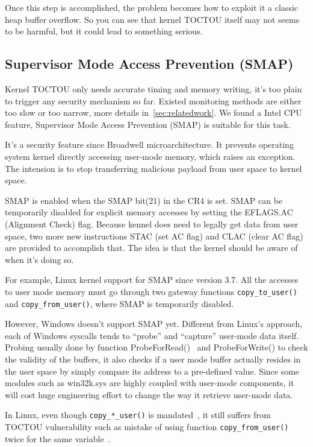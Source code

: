 Once this step is accomplished, the problem becomes how to exploit it a classic heap buffer overflow. So you can see that kernel TOCTOU itself may not seems to be harmful, but it could lead to something serious. 

\subsection{Supervisor Mode Access Prevention (SMAP)}
Kernel TOCTOU only needs accurate timing and memory writing, it's too plain to trigger any security mechanism so far. Existed monitoring methods are either too slow or too narrow, more details in~\autoref{sec:relatedwork}. We found a Intel CPU feature, Supervisor Mode Access Prevention (SMAP) is suitable for this task. 

It's a security feature since Broadwell microarchitecture. It prevents operating system kernel directly accessing user-mode memory, which raises an exception. The intension is to stop transferring malicious payload from user space to kernel space.

SMAP is enabled when the SMAP bit(21) in the CR4 is set. SMAP can be temporarily disabled for explicit memory accesses by setting the EFLAGS.AC (Alignment Check) flag. Because kennel does need to legally get data from user space, two more new instructions STAC (set AC flag) and CLAC (clear AC flag) are provided to accomplish that. The idea is that the kernel should be aware of when it's doing so. 

For example, Linux kernel support for SMAP since version 3.7. All the accesses to user mode memory must go through two gateway functions \texttt{copy\_to\_user()} and \texttt{copy\_from\_user()}, where SMAP is temporarily disabled.

However, Windows doesn't support SMAP yet. Different from Linux's approach, each of Windows syscalls tends to ``probe'' and ``capture'' user-mode data itself. Probing usually done by function ProbeForRead()~\cite{probeforread} and ProbeForWrite() to check the validity of the buffers, it also checks if a user mode buffer actually resides in the user space by simply compare its address to a pre-defined value. Since some modules such as win32k.sys are highly coupled with user-mode components, it will cost huge engineering effort to change the way it retrieve user-mode data.

In Linux, even though \texttt{copy\_*\_user()} is mandated~\cite{corbet2012linuxsmap}, it still suffers from TOCTOU vulnerability such as mistake of using function \texttt{copy\_from\_user()} twice for the same variable~\cite{double-fetch-linux}. 
